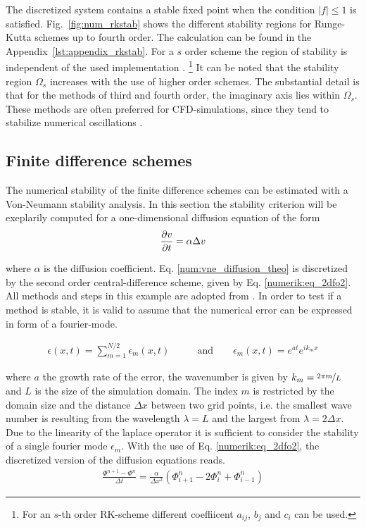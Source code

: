 The discretized system contains a stable fixed point when the condition $|f|\leq 1$ is satisfied.
Fig.~\ref{fig:num_rkstab} shows the different stability regions for Runge-Kutta schemes up to fourth order.
The calculation can be found in the Appendix~\ref{lst:appendix_rkstab}.
For a $s$ order scheme the region of stability is independent of the used implementation \citep{canuto2007}.
\footnote{For an $s$-th order RK-scheme different coeffiicent $a_{ij}$, $b_j$ and $c_i$ can be used.}
It can be noted that the stability region $\Omega_s$ increases with the use of higher order schemes.
The substantial detail is that for the  methods of third and fourth order, the imaginary axis lies within $\Omega_s$.
These methods are often preferred for  CFD-simulations, since they tend to stabilize numerical oscillations \citep{Lulff2011}.

\subsection{Finite difference schemes}

The numerical stability of the finite difference schemes can be estimated with a Von-Neumann stability analysis.
In this section the stability criterion will be exeplarily computed for a one-dimensional diffusion equation of the form
\begin{align}
    \label{num:vne_diffusion_theo}
    \pdn[v]{t} = \alpha \Delta v
\end{align}

where $\alpha$ is the diffusion coefficient. Eq.  \ref{num:vne_diffusion_theo} is discretized by
the second order central-difference scheme, given by Eq. \ref{numerik:eq_2dfo2}.
All methods and steps in this example are adopted from \citep{janderson}.
In order to test if a method is stable, it is valid to assume that the numerical error can be expressed in form of a fourier-mode.

\begin{align}
    \epsilon(x, t) = \sum_{m=1}^{N/2} \epsilon_m(x, t) \qquad &\text{and} \qquad  \epsilon_m(x, t) = e^{at}e^{i k_m x}
\end{align}

where $a$ the growth rate of the error, the wavenumber is given by $k_m=\nicefrac{2\pi m}{L}$ and $L$ is the size of the simulation domain.
The index $m$ is restricted by the domain size and the distance $\Delta x$ between two grid points, i.e. the smallest wave number
is resulting from the wavelength $\lambda=L$ and the largest from $\lambda=2\Delta x$.
Due to the linearity of the laplace operator it is sufficient to consider the stability of a single fourier mode $\epsilon_m$.
With the use of Eq.  \ref{numerik:eq_2dfo2}, the discretized version of the diffusion equations reads.
\begin{align}
    \label{num:neumann_diffusion_eq}
    \frac{\Phi^{n+1} - \Phi^n}{\Delta t} = \frac{\alpha}{\Delta x^2}\left(\Phi_{i+1}^n - 2\Phi_{i}^n + \Phi_{i-1}^n\right)
\end{align}

